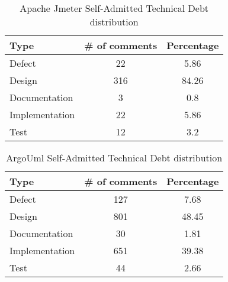 \begin{table*}[!hbt]
      \begin{center}
            \caption{Apache Jmeter Self-Admitted Technical Debt distribution}
            \label{tab:jmeter_td_details}
            \begin{tabular}{l| c c }
            \toprule
            \textbf{Type}    & \textbf{\# of comments}     & \textbf{Percentage}  \\ \midrule 
             Defect          & 22              & 5.86\\     
             Design          & 316             & 84.26\\    
             Documentation   & 3               & 0.8\\      
             Implementation  & 22              & 5.86\\    
             Test            & 12              & 3.2\\  \bottomrule                                   
            \end{tabular}
      \end{center}
\end{table*}

\begin{table*}[!hbt]
      \begin{center}
            \caption{ArgoUml Self-Admitted Technical Debt distribution}
            \label{tab:argo_td_details}
            \begin{tabular}{l| c c }
            \toprule
            \textbf{Type}   & \textbf{\# of comments}     & \textbf{Percentage}  \\ \midrule 
             Defect          &  127            &7.68 \\     
             Design          &  801            &48.45 \\    
             Documentation   &  30             &1.81 \\      
             Implementation  &  651            &39.38 \\    
             Test            &  44             &2.66 \\  \bottomrule                                   
            \end{tabular}
      \end{center}
\end{table*}

